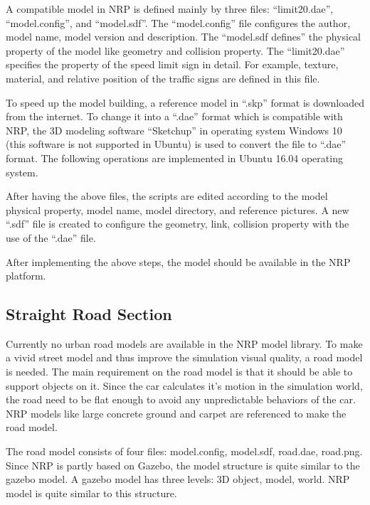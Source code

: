 A compatible model in NRP is defined mainly by three files: ``limit20.dae'', ``model.config'', and ``model.sdf''. The ``model.config'' file configures the author, model name, model version and description. The ``model.sdf defines'' the physical property of the model like geometry and collision property. The ``limit20.dae'' specifies the property of the speed limit sign in detail. For example, texture, material, and relative position of the traffic signs are defined in this file.



To speed up the model building, a reference model in ``.skp'' format is downloaded from the internet. To change it into a ``.dae'' format which is compatible with NRP, the 3D modeling software ``Sketchup'' in operating system Windows 10 (this software is not supported in Ubuntu) is used to convert the file to ``.dae'' format. The following operations are implemented in Ubuntu 16.04 operating system. 



After having the above files, the scripts are edited according to the model physical property, model name, model directory, and reference pictures. A new ``.sdf'' file is created to configure the geometry, link, collision property with the use of the ``.dae'' file. 

After implementing the above steps, the model should be available in the NRP platform.

\subsection{Straight Road Section}

Currently no urban road models are available in the NRP model library. To make a vivid street model and thus improve the simulation visual quality, a road model is needed. The main requirement on the road model is that it should be able to support objects on it. Since the car calculates it's motion in the simulation world, the road need to be flat enough to avoid any unpredictable behaviors of the car. NRP models like large concrete ground and carpet are referenced to make the road model.


The road model consists of four files: model.config, model.sdf, road.dae, road.png. Since NRP is partly based on Gazebo, the model structure is quite similar to the gazebo model. A gazebo model has three levels: 3D object, model, world. NRP model is quite similar to this structure. 


